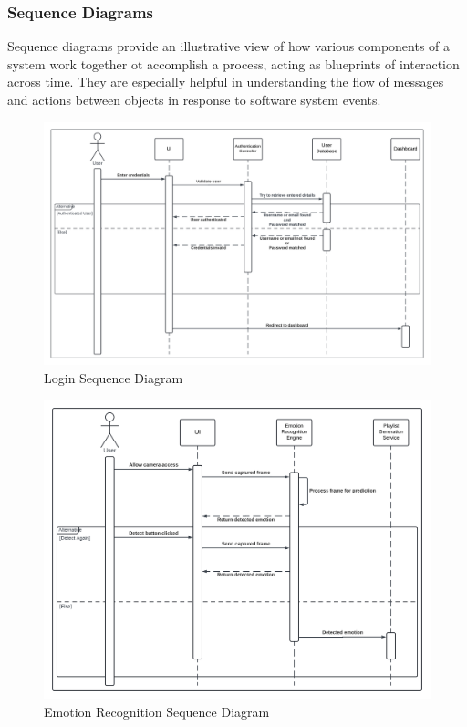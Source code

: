 \subsubsection{Sequence Diagrams}
Sequence diagrams provide an illustrative view of how various components of a system work together ot accomplish a process, acting as blueprints of interaction across time.\citep{bell_2004_explore}
They are especially helpful in understanding the flow of messages and actions between objects in response to software system events.
\begin{figure}[!ht]
    \centering
    \includegraphics[width=14cm]{Images/login-sequence.png}
    \caption{Login Sequence Diagram}
    \label{fig:login-sequence}
\end{figure}
\begin{figure}[!ht]
    \centering
    \includegraphics[width=14cm]{Images/fer-sequence.png}
    \caption{Emotion Recognition Sequence Diagram}
    \label{fig:fer-sequence}
\end{figure}

